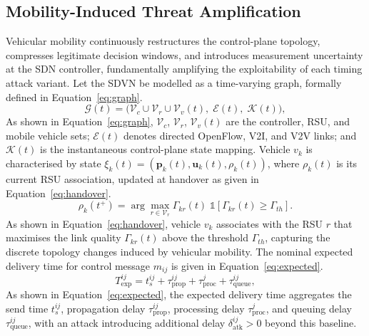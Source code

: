 \subsection{Mobility-Induced Threat Amplification}
\label{sec:mobility_amp}

Vehicular mobility continuously restructures the control-plane topology,
compresses legitimate decision windows, and introduces measurement
uncertainty at the SDN controller, fundamentally amplifying the
exploitability of each timing attack variant. Let the SDVN be modelled as a time-varying graph, formally defined in
Equation~\eqref{eq:graph}.
\begin{equation}
\mathcal{G}(t) = \bigl(\mathcal{V}_c \cup \mathcal{V}_r \cup
  \mathcal{V}_v(t),\;\mathcal{E}(t),\;\mathcal{K}(t)\bigr),
\label{eq:graph}
\end{equation}
As shown in Equation~\eqref{eq:graph}, $\mathcal{V}_c$,
$\mathcal{V}_r$, $\mathcal{V}_v(t)$ are the controller, RSU,
and mobile vehicle sets; $\mathcal{E}(t)$ denotes directed
OpenFlow, V2I, and V2V links; and $\mathcal{K}(t)$ is the
instantaneous control-plane state mapping.
Vehicle $v_k$ is characterised
by state $\xi_k(t)=(\mathbf{p}_k(t),\mathbf{u}_k(t),\rho_k(t))$, where $\rho_k(t)$ is its current RSU association, updated at handover
as given in Equation~\eqref{eq:handover}.
\begin{equation}
\rho_k(t^+) = \arg\max_{r\in\mathcal{V}_r}
  \Gamma_{kr}(t)\;\mathbb{1}[\Gamma_{kr}(t)\geq\Gamma_{th}].
\label{eq:handover}
\end{equation}
As shown in Equation~\eqref{eq:handover}, vehicle $v_k$ associates
with the RSU $r$ that maximises the link quality $\Gamma_{kr}(t)$
above the threshold $\Gamma_{th}$, capturing the discrete topology
changes induced by vehicular mobility.
The nominal expected delivery time for control message $m_{ij}$ is given in Equation~\eqref{eq:expected}.
\begin{equation}
T_{\mathrm{exp}}^{ij} = t_s^{ij} + \tau_{\mathrm{prop}}^{ij}
  + \tau_{\mathrm{proc}}^{j} + \tau_{\mathrm{queue}}^{ij},
\label{eq:expected}
\end{equation}
As shown in Equation~\eqref{eq:expected}, the expected delivery
time aggregates the send time $t_s^{ij}$, propagation delay
$\tau_{\mathrm{prop}}^{ij}$, processing delay
$\tau_{\mathrm{proc}}^{j}$, and queuing delay
$\tau_{\mathrm{queue}}^{ij}$, with an attack introducing
additional delay $\delta_{\mathrm{atk}}^{ij}>0$ beyond this
baseline.


